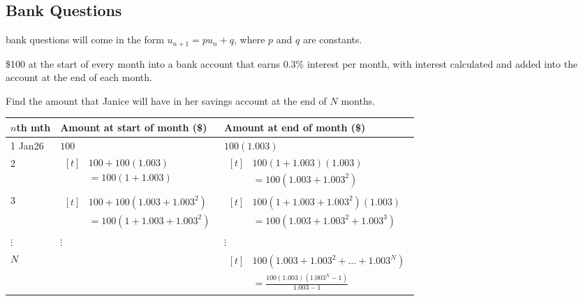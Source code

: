 \documentclass[a4paper,11pt,oneside]{book}
\begin{document}
\subsection{Bank Questions}
\begin{info}[title=Important Note]
 bank questions will come in the form $u_{n+1}=pu_n+q$, where $p$ and $q$ are constants.
\end{info}
\medskip
{}\par
{} \$100 at the start of every month into a bank account that earns 0.3\% interest per month, with interest calculated and added into the account at the end of each month.\par
Find the amount that Janice will have in her savings account at the end of $N$ months.\par\medskip
{\small\renewcommand{\arraystretch}{1.3}\begin{tabular}{|l|l|l|}\hline
$n$th mth&Amount at start of month (\$)&Amount at end of month (\$)\\\hline
1 Jan26&$100$&$100(1.003)$\\\hline
2&$\begin{aligned}[t]&100+100(1.003)\\&=100(1+1.003)\end{aligned}$&$\begin{aligned}[t]&100(1+1.003)(1.003)\\&=100\left(1.003+1.003^{2}\right)\end{aligned}$\\\hline
3&$\begin{aligned}[t]&100+100\left(1.003+1.003^{2}\right)\\&=100\left(1+1.003+1.003^{2}\right)\end{aligned}$&$\begin{aligned}[t]&100\left(1+1.003+1.003^{2}\right)(1.003)\\&=100\left(1.003+1.003^{2}+1.003^{3}\right)\end{aligned}$\\\hline
$\vdots$&$\vdots$&$\vdots$\\\hline
$N$&&$\begin{aligned}[t]&100\left(1.003+1.003^{2}+\dots+1.003^{N}\right)\\&=\frac{100(1.003)\left(1.003^{N}-1\right)}{1.003-1}\end{aligned}$\\\hline
\end{tabular}}\par\medskip
{}
\end{document}

